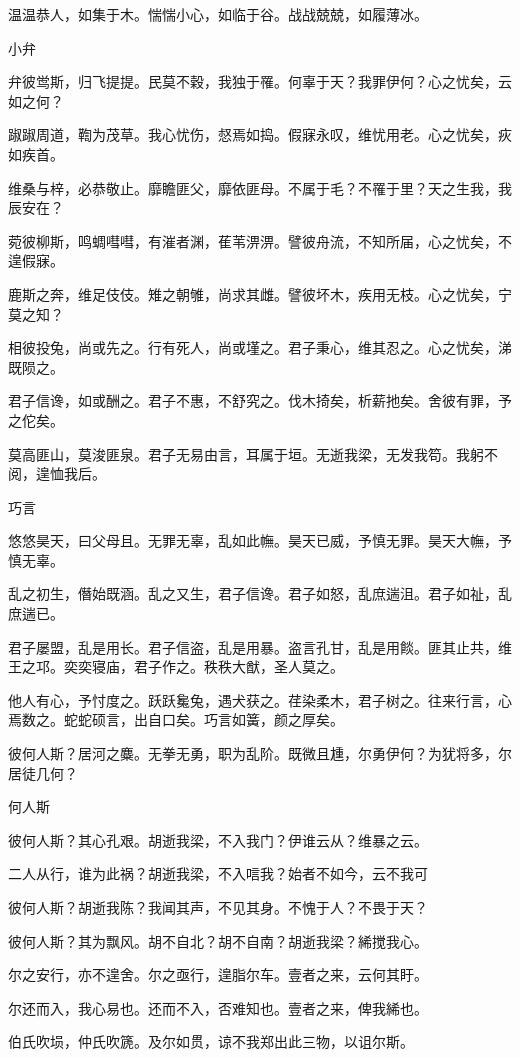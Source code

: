 温温恭人，如集于木。惴惴小心，如临于谷。战战兢兢，如履薄冰。

小弁

弁彼鸴斯，归飞提提。民莫不穀，我独于罹。何辜于天？我罪伊何？心之忧矣，云如之何？

踧踧周道，鞫为茂草。我心忧伤，惄焉如捣。假寐永叹，维忧用老。心之忧矣，疢如疾首。

维桑与梓，必恭敬止。靡瞻匪父，靡依匪母。不属于毛？不罹于里？天之生我，我辰安在？

菀彼柳斯，鸣蜩嘒嘒，有漼者渊，萑苇淠淠。譬彼舟流，不知所届，心之忧矣，不遑假寐。

鹿斯之奔，维足伎伎。雉之朝雊，尚求其雌。譬彼坏木，疾用无枝。心之忧矣，宁莫之知？

相彼投兔，尚或先之。行有死人，尚或墐之。君子秉心，维其忍之。心之忧矣，涕既陨之。

君子信谗，如或酬之。君子不惠，不舒究之。伐木掎矣，析薪扡矣。舍彼有罪，予之佗矣。

莫高匪山，莫浚匪泉。君子无易由言，耳属于垣。无逝我梁，无发我笱。我躬不阅，遑恤我后。

巧言

悠悠昊天，曰父母且。无罪无辜，乱如此幠。昊天已威，予慎无罪。昊天大幠，予慎无辜。

乱之初生，僭始既涵。乱之又生，君子信谗。君子如怒，乱庶遄沮。君子如祉，乱庶遄已。

君子屡盟，乱是用长。君子信盗，乱是用暴。盗言孔甘，乱是用餤。匪其止共，维王之邛。奕奕寝庙，君子作之。秩秩大猷，圣人莫之。

他人有心，予忖度之。跃跃毚兔，遇犬获之。荏染柔木，君子树之。往来行言，心焉数之。蛇蛇硕言，出自口矣。巧言如簧，颜之厚矣。

彼何人斯？居河之麋。无拳无勇，职为乱阶。既微且尰，尔勇伊何？为犹将多，尔居徒几何？

何人斯

彼何人斯？其心孔艰。胡逝我梁，不入我门？伊谁云从？维暴之云。

二人从行，谁为此祸？胡逝我梁，不入唁我？始者不如今，云不我可

彼何人斯？胡逝我陈？我闻其声，不见其身。不愧于人？不畏于天？

彼何人斯？其为飘风。胡不自北？胡不自南？胡逝我梁？絺搅我心。

尔之安行，亦不遑舍。尔之亟行，遑脂尔车。壹者之来，云何其盱。

尔还而入，我心易也。还而不入，否难知也。壹者之来，俾我絺也。

伯氏吹埙，仲氏吹篪。及尔如贯，谅不我郑出此三物，以诅尔斯。

